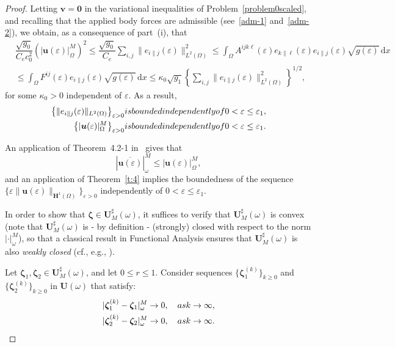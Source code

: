 \documentclass{amsart}
\def\dd{\, \mathrm{d}}
\begin{document}
\begin{proof}
Letting $\bm{v}=\bm{0}$ in the variational inequalities of Problem~\ref{problem0scaled}, and recalling that the applied body forces are admissible (see~\eqref{adm-1} and~\eqref{adm-2}), we obtain, as a consequence of part~(i), that
\begin{equation*}
\begin{aligned}
	&\dfrac{\sqrt{g_0}}{C_e c_0^2}\left(|\bm{u}(\varepsilon)|_\Omega^M\right)^2 \le \dfrac{\sqrt{g_0}}{C_e} \sum_{i,j}\|e_{i\|j}(\varepsilon)\|_{L^2(\Omega)}^2 \le \int_{\Omega} A^{ijk\ell}(\varepsilon) e_{k\|\ell}(\varepsilon) e_{i\|j}(\varepsilon) \sqrt{g(\varepsilon)} \dd x\\
	&\le \int_{\Omega} F^{ij}(\varepsilon) e_{i\|j}(\varepsilon) \sqrt{g(\varepsilon)} \dd x \le \kappa_0 \sqrt{g_1} \left\{\sum_{i,j} \|e_{i\|j}(\varepsilon)\|_{L^2(\Omega)}^2\right\}^{1/2},
\end{aligned}
\end{equation*}
for some $\kappa_0>0$ independent of $\varepsilon$. As a result,
\begin{equation*}
	\begin{aligned}
		\left\{\|e_{i\|j}(\varepsilon)\|_{L^2(\Omega)}\right\}_{\varepsilon>0} &\textup{ is bounded independently of } 0<\varepsilon\le \varepsilon_1,\\
		\left\{|\bm{u}(\varepsilon)|_\Omega^M\right\}_{\varepsilon>0} &\textup{ is bounded independently of } 0<\varepsilon\le \varepsilon_1.
	\end{aligned}
\end{equation*}

An application of Theorem~4.2-1 in~\cite{Ciarlet2000} gives that
\begin{equation*}
	\left|\overline{\bm{u}(\varepsilon)}\right|_\omega^M \le |\bm{u}(\varepsilon)|_\Omega^M,
\end{equation*}
and an application of Theorem~\ref{t:4} implies the boundedness of the sequence $\{\varepsilon\|\bm{u}(\varepsilon)\|_{\bm{H}^1(\Omega)}\}_{\varepsilon>0}$ independently of $0<\varepsilon\le\varepsilon_1$.

In order to show that $\bm{\zeta} \in \bm{U}_M^\sharp(\omega)$, it suffices to verify that $\bm{U}_M^\sharp(\omega)$ is convex (note that $\bm{U}_M^\sharp(\omega)$ is - by definition - (strongly) closed with respect to the norm $|\cdot|_\omega^M$), so that a classical result in Functional Analysis ensures that $\bm{U}_M^\sharp(\omega)$ is also \emph{weakly closed} (cf., e.g., \cite{Brez11}).

Let $\bm{\zeta}_1, \bm{\zeta}_2 \in \bm{U}_M^\sharp(\omega)$, and let $0\le r\le 1$.
Consider sequences $\{\bm{\zeta}_1^{(k)}\}_{k\ge 0}$ and $\{\bm{\zeta}_2^{(k)}\}_{k\ge0}$ in $\bm{U}(\omega)$ that satisfy:
\begin{equation*}
	\begin{aligned}
		|\bm{\zeta}_1^{(k)}-\bm{\zeta}_1|_\omega^M & \to 0, \quad\textup{ as } k\to\infty,\\
		|\bm{\zeta}_2^{(k)}-\bm{\zeta}_2|_\omega^M & \to 0, \quad\textup{ as } k\to\infty.
	\end{aligned}
\end{equation*}


\end{proof}
\end{document}
